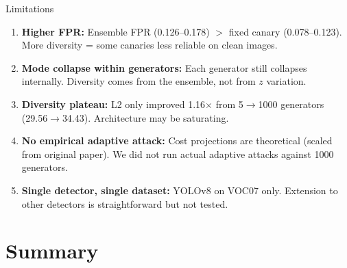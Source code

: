 \documentclass[aspectratio=169,11pt]{beamer}
\begin{document}
\begin{frame}{Limitations}
\begin{enumerate}
    \item \textbf{Higher FPR:} Ensemble FPR (0.126--0.178) $>$ fixed canary (0.078--0.123). More diversity = some canaries less reliable on clean images.

    \vspace{0.2cm}
    \item \textbf{Mode collapse within generators:} Each generator still collapses internally. Diversity comes from the ensemble, not from $z$ variation.

    \vspace{0.2cm}
    \item \textbf{Diversity plateau:} L2 only improved 1.16$\times$ from 5$\to$1000 generators (29.56$\to$34.43). Architecture may be saturating.

    \vspace{0.2cm}
    \item \textbf{No empirical adaptive attack:} Cost projections are theoretical (scaled from original paper). We did not run actual adaptive attacks against 1000 generators.

    \vspace{0.2cm}
    \item \textbf{Single detector, single dataset:} YOLOv8 on VOC07 only. Extension to other detectors is straightforward but not tested.
\end{enumerate}
\end{frame}

\section{Summary}
\end{document}
